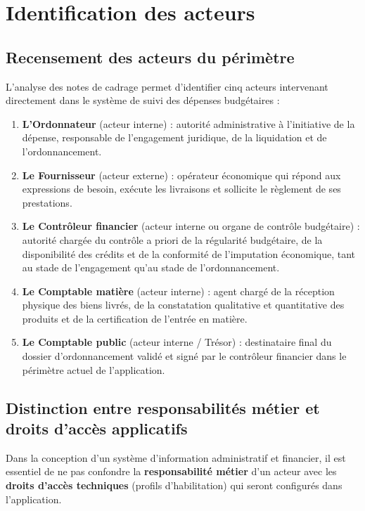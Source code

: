 \section{Identification des acteurs}

\subsection{Recensement des acteurs du périmètre}

L'analyse des notes de cadrage permet d'identifier cinq acteurs intervenant directement dans le système de suivi des dépenses budgétaires :

\begin{enumerate}
  \item \textbf{L'Ordonnateur} (acteur interne) : autorité administrative à l'initiative de la dépense, responsable de l'engagement juridique, de la liquidation et de l'ordonnancement.
  \item \textbf{Le Fournisseur} (acteur externe) : opérateur économique qui répond aux expressions de besoin, exécute les livraisons et sollicite le règlement de ses prestations.
  \item \textbf{Le Contrôleur financier} (acteur interne ou organe de contrôle budgétaire) : autorité chargée du contrôle a priori de la régularité budgétaire, de la disponibilité des crédits et de la conformité de l'imputation économique, tant au stade de l'engagement qu'au stade de l'ordonnancement.
  \item \textbf{Le Comptable matière} (acteur interne) : agent chargé de la réception physique des biens livrés, de la constatation qualitative et quantitative des produits et de la certification de l'entrée en matière.
  \item \textbf{Le Comptable public} (acteur interne / Trésor) : destinataire final du dossier d'ordonnancement validé et signé par le contrôleur financier dans le périmètre actuel de l'application.
\end{enumerate}

\subsection{Distinction entre responsabilités métier et droits d'accès applicatifs}

Dans la conception d'un système d'information administratif et financier, il est essentiel de ne pas confondre la \textbf{responsabilité métier} d'un acteur avec les \textbf{droits d'accès techniques} (profils d'habilitation) qui seront configurés dans l'application.

